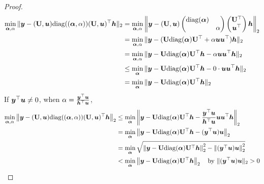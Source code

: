 \documentclass{article} %
\def\valpha{{\bm\alpha}}
\begin{document}
	\begin{proof}
		\begin{equation}
			\label{equ:trans_bound2}
			\begin{aligned}
				\min_{\valpha,\alpha}\|\vy-(\rmU,\vu)\mathrm{diag}((\valpha,\alpha))(\rmU,\vu)^{\top}\vh\|_2&=\min_{\valpha,\alpha}\left\|\vy-(\rmU,\vu)
				\begin{pmatrix}
					\mathrm{diag}(\valpha) \\
					& \alpha \\
				\end{pmatrix}
				\begin{pmatrix}
					\rmU^{\top} \\
					\vu^{\top} \\
				\end{pmatrix}\vh\right\|_2\\
				&=\min_{\valpha,\alpha}\|\vy-(\rmU\mathrm{diag}(\valpha)\rmU^{\top}+\alpha\vu\vu^{\top})\vh\|_2\\
				&=\min_{\valpha,\alpha}\|\vy-\rmU\mathrm{diag}(\valpha)\rmU^{\top}\vh-\alpha\vu\vu^{\top}\vh\|_2\\
				&\leq\min_{\valpha}\|\vy-\rmU\mathrm{diag}(\valpha)\rmU^{\top}\vh-0\cdot\vu\vu^{\top}\vh\|_2\\
				&=\min_{\valpha}\|\vy-\rmU\mathrm{diag}(\valpha)\rmU^{\top}\vh\|_2\\
			\end{aligned}
		\end{equation}
		If ${\bm{y}}^{\top}{\bm{u}}\neq 0$, when $\alpha=\frac{{\bm{y}}^{\top}{\bm{u}}}{{\bm{h}}^{\top}{\bm{u}}}$,
		\begin{equation}
			\label{equ:trans_bound3}
			\begin{aligned}
				\min_{\valpha,\alpha}\left\|\vy-(\rmU,\vu)\mathrm{diag}((\valpha,\alpha))(\rmU,\vu)^{\top}\vh\right\|_2&\leq\min_{\valpha}\left\|\vy-\rmU\mathrm{diag}(\valpha)\rmU^{\top}\vh-\frac{\vy^{\top}\vu}{\vh^{\top}\vu}\vu\vu^{\top}\vh\right\|_2\\
				&=\min_{\valpha}\left\|\vy-\rmU\mathrm{diag}(\valpha)\rmU^{\top}\vh-(\vy^{\top}\vu)\vu\right\|_2\\
				&=\min_{\valpha}\sqrt{\left\|\vy-\rmU\mathrm{diag}(\valpha)\rmU^{\top}\vh\right\|_2^2-\left\|(\vy^{\top}\vu)\vu\right\|_2^2}\\
				&<\min_{\valpha}\left\|\vy-\rmU\mathrm{diag}(\valpha)\rmU^{\top}\vh\right\|_2\quad\textrm{by $\|(\vy^{\top}\vu)\vu\|_2>0$}\\
			\end{aligned}
		\end{equation}
	\end{proof}
	
\end{document}
